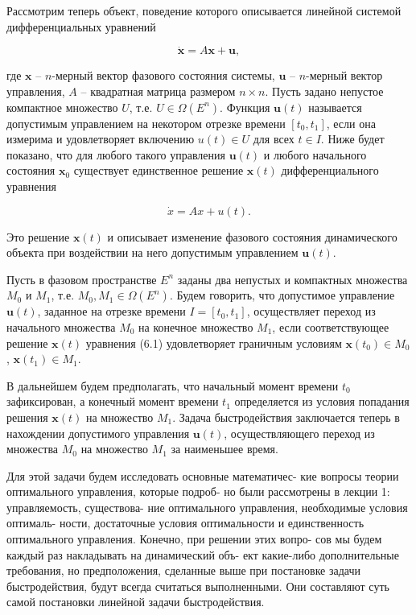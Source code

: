 \documentclass[8pt]{extarticle}
\begin{document}
Рассмотрим теперь объект, поведение которого описывается линейной системой дифференциальных уравнений

\[
\dot{\mathbf{x}} = A\mathbf{x} + \mathbf{u},
\]

где \(\mathbf{x}\) -- \(n\)-мерный вектор фазового состояния системы, \(\mathbf{u}\) -- \(n\)-мерный вектор управления, \(A\) -- квадратная матрица размером \(n \times n\). Пусть задано непустое компактное множество \(U\), т.е. \(U \in \Omega \left( {E}^{n}\right)\). Функция \(\mathbf{u}(t)\) называется допустимым управлением на некотором отрезке времени \(\left[ t_{0},t_{1}\right]\), если она измерима и удовлетворяет включению \(u\left( t\right) \in U\) для всех \(t \in I\). Ниже будет показано, что для любого такого управления \(\mathbf{u}(t)\) и любого начального состояния \(\mathbf{x}_{0}\) существует единственное решение \(\mathbf{x}\left( t\right)\) дифференциального уравнения

\[
\dot{x} = {Ax} + u\left( t\right) . \tag{6.1}
\]

Это решение \(\mathbf{x}\left( t\right)\) и описывает изменение фазового состояния динамического объекта при воздействии на него допустимым управлением \(\mathbf{u}\left( t\right)\).

Пусть в фазовом пространстве \(E^{n}\) заданы два непустых и компактных множества \(M_{0}\) и \(M_{1}\), т.е. \(M_{0},M_{1} \in \Omega \left( {E}^{n}\right)\). Будем говорить, что допустимое управление \(\mathbf{u}\left( t\right)\), заданное на отрезке времени \(I = \left[ t_{0},t_{1}\right]\), осуществляет переход из начального множества \(M_{0}\) на конечное множество \(M_{1}\), если соответствующее решение \(\mathbf{x}(t)\) уравнения (6.1) удовлетворяет граничным условиям \(\mathbf{x}\left( t_{0}\right) \in M_{0}\), \(\mathbf{x}\left( t_{1}\right) \in M_{1}\).

В дальнейшем будем предполагать, что начальный момент времени \(t_{0}\) зафиксирован, а конечный момент времени \(t_{1}\) определяется из условия попадания решения \(\mathbf{x}(t)\) на множество \(M_{1}\). Задача быстродействия заключается теперь в нахождении допустимого управления \(\mathbf{u}\left( t\right)\), осуществляющего переход из множества \(M_{0}\) на множество \(M_{1}\) за наименьшее время.

Для этой задачи будем исследовать основные математичес- кие вопросы теории оптимального управления, которые подроб- но были рассмотрены в лекции 1: управляемость, существова- ние оптимального управления, необходимые условия оптималь- ности, достаточные условия оптимальности и единственность оптимального управления. Конечно, при решении этих вопро- сов мы будем каждый раз накладывать на динамический объ- ект какие-либо дополнительные требования, но предположения, сделанные выше при постановке задачи быстродействия, будут всегда считаться выполненными. Они составляют суть самой постановки линейной задачи быстродействия.
\end{document}
